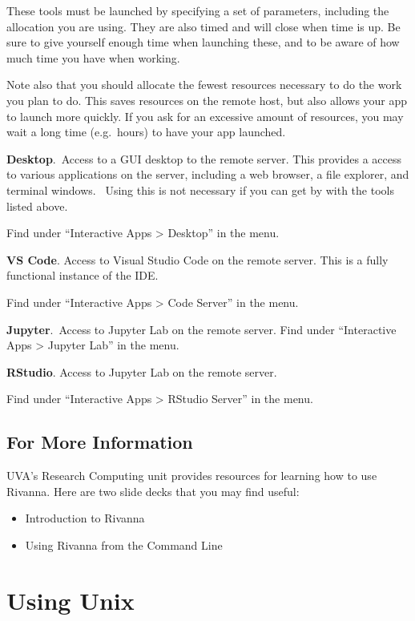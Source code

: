 \documentclass[
  letterpaper,
  DIV=11,
  numbers=noendperiod]{scrreport}
\providecommand{\tightlist}{%
  \setlength{\itemsep}{0pt}\setlength{\parskip}{0pt}}\usepackage{longtable,booktabs,array}
\begin{document}
These tools must be launched by specifying a set of parameters,
including the allocation you are using. They are also timed and will
close when time is up. Be sure to give yourself enough time when
launching these, and to be aware of how much time you have when working.

Note also that you should allocate the fewest resources necessary to do
the work you plan to do. This saves resources on the remote host, but
also allows your app to launch more quickly. If you ask for an excessive
amount of resources, you may wait a long time (e.g.~hours) to have your
app launched.

\textbf{Desktop}.~Access to a GUI desktop to the remote server. This
provides a access to various applications on the server, including a web
browser, a file explorer, and terminal windows.~ Using this is not
necessary if you can get by with the tools listed above.

Find under ``Interactive Apps \textgreater{} Desktop'' in the menu.

\textbf{VS Code}. Access to Visual Studio Code on the remote server.
This is a fully functional instance of the IDE.

Find under ``Interactive Apps \textgreater{} Code Server'' in the menu.

\textbf{Jupyter}.~Access to Jupyter Lab on the remote server. Find under
``Interactive Apps \textgreater{} Jupyter Lab'' in the menu.

\textbf{RStudio}. Access to Jupyter Lab on the remote server.

Find under ``Interactive Apps \textgreater{} RStudio Server'' in the
menu.

\hypertarget{for-more-information}{%
\section{For More Information}\label{for-more-information}}

UVA's Research Computing unit provides resources for learning how to use
Rivanna. Here are two slide decks that you may find useful:

\begin{itemize}
\tightlist
\item
  Introduction to Rivanna
\item
  Using Rivanna from the Command Line
\end{itemize}

\hypertarget{using-unix}{%
\chapter{Using Unix}\label{using-unix}}
\end{document}
